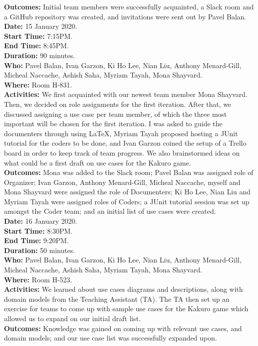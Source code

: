 \documentclass[12pt]{article}
\begin{document}
{\bf Outcomes:} Initial team members were successfully acquainted, a Slack room and a GitHub repository was created, and invitations were sent out by Pavel Balan.
\pagebreak \\
{\bf Date:} 15 January 2020. \\
{\bf Start Time:} 7:15PM. \\
{\bf End Time:} 8:45PM. \\
{\bf Duration:} 90 minutes. \\
{\bf Who:} Pavel Balan, Ivan Garzon, Ki Ho Lee, Nian Liu, Anthony Menard-Gill, \\
\hspace{10mm} Micheal Naccache, Ashish Saha, Myriam Tayah, Mona Shayvard. \\
{\bf Where:} Room H-831. \\
{\bf Activities:} We first acquainted with our newest team member Mona Shayvard. Then, we decided on role assignments for the first iteration. After that, we discussed assigning a use case per team member, of which the three most important will be chosen for the first iteration. I was asked to guide the documenters through using LaTeX, Myriam Tayah proposed hosting a JUnit tutorial for the coders to be done, and Ivan Garzon coined the setup of a Trello board in order to keep track of team progress. We also brainstormed ideas on what could be a first draft on use cases for the Kakuro game.\\
{\bf Outcomes:} Mona was added to the Slack room; Pavel Balan was assigned role of Organizer; 
Ivan Garzon, Anthony Menard-Gill, Micheal Naccache, myself and Mona Shayvard were assigned the role of Documenters; Ki Ho Lee, Nian Liu and Myriam Tayah were assigned roles of Coders; a JUnit tutorial session was set up amongst the Coder team; and an initial list of use cases were created.
\vspace*{0.2in} \\
{\bf Date:} 16 January 2020. \\
{\bf Start Time:} 8:30PM. \\
{\bf End Time:} 9:20PM. \\
{\bf Duration:} 50 minutes. \\
{\bf Who:} Pavel Balan, Ivan Garzon, Ki Ho Lee, Nian Liu, Anthony Menard-Gill, \\
\hspace{10mm} Micheal Naccache, Ashish Saha, Myriam Tayah, Mona Shayvard. \\
{\bf Where:} Room H-523. \\
{\bf Activities:} We learned about use cases diagrams and descriptions, along with domain models from the Teaching Assistant (TA). The TA then set up an exercise for teams to come up with sample use cases for the Kakuro game which allowed us to expand on our initial draft list. \\
{\bf Outcomes:} Knowledge was gained on coming up with relevant use cases, and domain models; and our use case list was successfully expanded upon.


\end{document}
